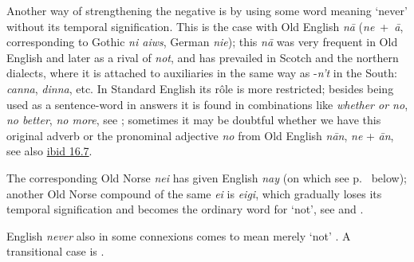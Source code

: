 Another way of strengthening the negative is by using some word meaning `never' without its temporal signification. This is the case with Old English \textit{nā} (\textit{ne}~+~\textit{ā}, corresponding to Gothic \textit{ni aiws}, German \textit{nie}); this \textit{nā} was very frequent in Old English and later as a rival of \textit{not}, and has prevailed in Scotch and the northern dialects, where it is attached to auxiliaries in the same way as -\textit{n't} in the South: \textit{canna}, \textit{dinna}, etc. In Standard English its rôle is more restricted; besides being used as a sentence-word in answers it is found in combinations like \textit{whether or no}, \textit{no better}, \textit{no more}, see \citet[\href{https://archive.org/details/jespersen-1954-a-modern-english-grammar-on-historical-principles-part-ii-syntax-first-volume/page/424/mode/2up?view=theater}{16.8}]{jespersenMEG2}; sometimes it may be doubtful whether we have this original adverb or the pronominal adjective \textit{no} from Old English \textit{nān}, \textit{ne} + \textit{ān}, see also \href{https://archive.org/details/jespersen-1954-a-modern-english-grammar-on-historical-principles-part-ii-syntax-first-volume/page/424/mode/2up?view=theater}{ibid 16.7}.

The corresponding Old Norse \textit{nei} has given English \textit{nay} (on which see p.~\pageref{ch10-nay} below); another Old Norse compound of the same \textit{ei} is \textit{eigi}, which gradually loses its temporal signification and becomes the ordinary word for `not', see \citet[\href{https://archive.org/details/germanische-syntax-i-zu-den-negativen-s/page/40/mode/2up?q=eigi&view=theater}{40ff}]{delbruck_negativen_1910}
and \citet[15ff]{neckel1912germanischen}.

English \textit{never} also in some connexions comes to mean merely `not' . A transitional case is .

